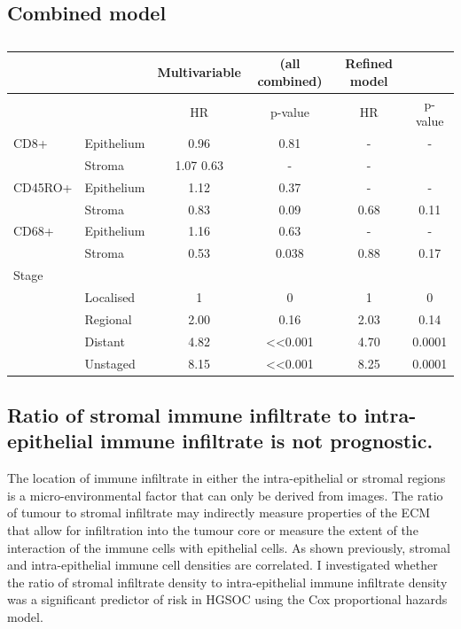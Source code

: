 \subsection{Combined model}
\begin{table}[]
    \centering
    \begin{tabular}{llcccc} \hline
&&	Multivariable & (all combined) &	Refined model &\\ \hline
	&&	HR&	p-value&	HR&	p-value\\
CD8+&	Epithelium&	0.96&	0.81&	-	&-\\
	&Stroma&	1.07	0.63	&-&	-\\
CD45RO+&	Epithelium&	1.12&	0.37	&-&	-\\
	&Stroma	&0.83	&0.09	&0.68&	0.11\\
CD68+&	Epithelium&	1.16&	0.63	&-&	-\\
	&Stroma	&0.53&	0.038&	0.88	&0.17\\
Stage &&&&&\\
&Localised&	1&	0&	1&	0\\
&	Regional&	2.00&	0.16&	2.03&	0.14\\
&	Distant&	4.82&	<<0.001&	4.70&	0.0001\\
&	Unstaged	&8.15&	<<0.001&	8.25&	0.0001\\ \hline

    \end{tabular}
    \caption{}
    \label{tab:cox_combined}
\end{table}

\subsection{Ratio of stromal immune infiltrate to intra-epithelial immune infiltrate is not prognostic.}

The location of immune infiltrate in either the intra-epithelial or stromal regions is a micro-environmental factor that can only be derived from images. The ratio of tumour to stromal infiltrate may indirectly  measure properties of the ECM that allow for infiltration into the tumour core or measure the extent of the interaction of the immune cells with epithelial cells. As shown previously, stromal and intra-epithelial immune cell densities are correlated. I investigated whether the ratio of stromal infiltrate density to intra-epithelial immune infiltrate density was a significant predictor of risk in HGSOC using the Cox proportional hazards model.

